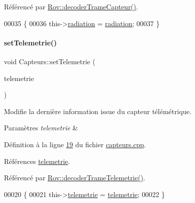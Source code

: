 Référencé par \hyperlink{rov_8cpp_source_l00086}{Rov\+::decoder\+Trame\+Capteur()}.


\begin{DoxyCode}
00035 \{
00036     this->\hyperlink{class_capteurs_ad9d6f3fd6cc164c6cd5908fd7822f307}{radiation} = \hyperlink{class_capteurs_ad9d6f3fd6cc164c6cd5908fd7822f307}{radiation};
00037 \}
\end{DoxyCode}
\mbox{\label{class_capteurs_a399af986afb9d707138bc57a51e1f34f}} 
\paragraph{\texorpdfstring{set\+Telemetrie()}{setTelemetrie()}}
{\footnotesize\ttfamily void Capteurs\+::set\+Telemetrie (\begin{DoxyParamCaption}\item[{Q\+String}]{telemetrie }\end{DoxyParamCaption})}



Modifie la dernière information issue du capteur télémétrique. 


\begin{DoxyParams}{Paramètres}
{\em telemetrie} & \\
\hline
\end{DoxyParams}


Définition à la ligne \hyperlink{capteurs_8cpp_source_l00019}{19} du fichier \hyperlink{capteurs_8cpp_source}{capteurs.\+cpp}.



Références \hyperlink{capteurs_8h_source_l00022}{telemetrie}.



Référencé par \hyperlink{rov_8cpp_source_l00081}{Rov\+::decoder\+Trame\+Telemetrie()}.


\begin{DoxyCode}
00020 \{
00021     this->\hyperlink{class_capteurs_a336a4c4ad6ae1a49d21b265d2953e24b}{telemetrie} = \hyperlink{class_capteurs_a336a4c4ad6ae1a49d21b265d2953e24b}{telemetrie};
00022 \}
\end{DoxyCode}
\mbox{\label{class_capteurs_a8d6a0bceb4d236edf7b51335d9be8ecd}} 
